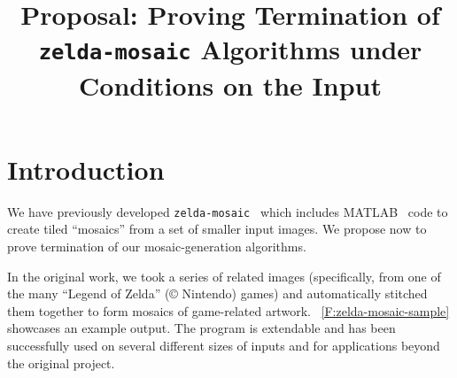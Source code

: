 \documentclass[11pt,conference]{IEEEtran}
\begin{document}
\title{Proposal: Proving Termination of \texttt{zelda-mosaic} Algorithms under Conditions on the Input}

\author{
\and
{}
}

\maketitle



\section{Introduction}

We have previously developed \texttt{zelda-mosaic}~\cite{zelda_mosaic} which
includes MATLAB~\cite{matlab} code to create tiled ``mosaics'' from a set of
smaller input images. We propose now to prove termination of our
mosaic-generation algorithms.

In the original work, we took a series of related images (specifically, from one
of the many ``Legend of Zelda'' ({\copyright} Nintendo) games) and automatically
stitched them together to form mosaics of game-related artwork.
\figurename~\ref{F:zelda-mosaic-sample} showcases an example output. The program
is extendable and has been successfully used on several different sizes of
inputs and for applications beyond the original project.
\end{document}
